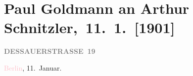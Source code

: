 

\renewcommand{\erwaehnteInstitutionen}{Institutionen: k. u. k. Kriegsministerium}
\renewcommand{\erwaehnteOrte}{Orte: Berlin, Dessauer Straße, Wien}
\renewcommand{\erwaehnteWerke}{Werke: Berliner Börsen-Courier, Lieutenant Gustl. Novelle, Neue Freie Presse, [Telegramm zu den Maßregelungen der Militärbehörde resp. Lieutenant Gustl]}
\section[ Paul Goldmann an Arthur Schnitzler, 11. 1. {[}1901{]}]{Paul Goldmann an Arthur Schnitzler, 11. 1. {[}1901{]}}
\nopagebreak{}
\rehead{ }\normalsize\beginnumbering{}
\toendnotes[C]{\smallbreak\pagebreak[2]}
\toendnotes[C]{\smallbreak}
\pstart
           \noindent{}\raggedleft{}{\pb}\textcolor{pink}{\textcolor{gray}{\textbf{DESSAUERSTRASSE 19}}}{}\ledrightnote{\textcolor{pink}{Dessauer Straße}}\pend
           
\pstart
           \textcolor{pink}{Berlin}{}\ledrightnote{\textcolor{pink}{Berlin}}, 11. Januar.\pend
           
